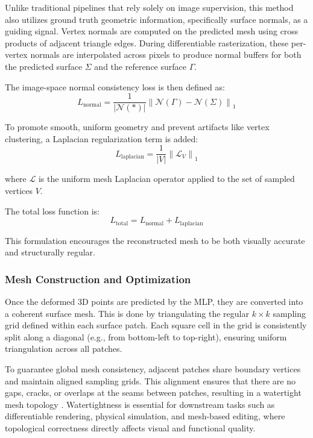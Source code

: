 Unlike traditional pipelines that rely solely on image supervision, this method also utilizes ground truth geometric information, specifically surface normals, as a guiding signal.
Vertex normals are computed on the predicted mesh using cross products of adjacent triangle edges.
During differentiable rasterization, these per-vertex normals are interpolated across pixels to produce normal buffers for both the predicted surface $\Sigma$ and the reference surface $\Gamma$.

The image-space normal consistency loss is then defined as:
\[
L_{\text{normal}} = \frac{1}{|\mathcal{N}(*)|} \left\| \mathcal{N}(\Gamma) - \mathcal{N}(\Sigma) \right\|_1
\]

To promote smooth, uniform geometry and prevent artifacts like vertex clustering, a Laplacian regularization term is added:
\[
L_{\text{laplacian}} = \frac{1}{|V|} \left\| \mathcal{L}_V \right\|_1
\]

where $\mathcal{L}$ is the uniform mesh Laplacian operator applied to the set of sampled vertices $V$.

The total loss function is:
\[
L_{\text{total}} = L_{\text{normal}} + L_{\text{laplacian}}
\]

This formulation encourages the reconstructed mesh to be both visually accurate and structurally regular.

\subsubsection{Mesh Construction and Optimization}

Once the deformed 3D points are predicted by the MLP, they are converted into a coherent surface mesh.
This is done by triangulating the regular $k \times k$ sampling grid defined within each surface patch.
Each square cell in the grid is consistently split along a diagonal (e.g., from bottom-left to top-right), ensuring uniform triangulation across all patches.

To guarantee global mesh consistency, adjacent patches share boundary vertices and maintain aligned sampling grids.
This alignment ensures that there are no gaps, cracks, or overlaps at the seams between patches, resulting in a watertight mesh topology \cite{sivaram2024}.
Watertightness is essential for downstream tasks such as differentiable rendering, physical simulation, and mesh-based editing, where topological correctness directly affects visual and functional quality.


